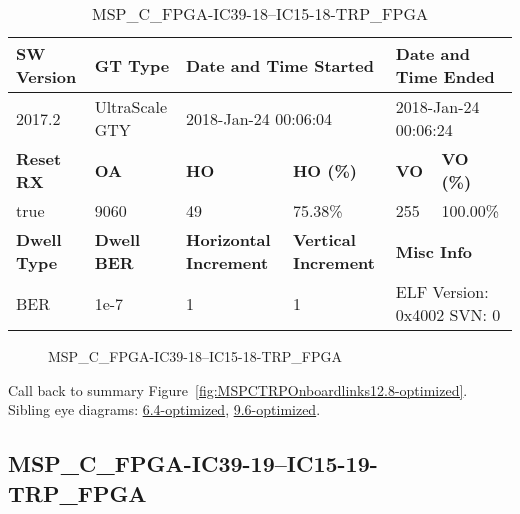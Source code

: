 \begin{table}[h]
\centering
\caption{MSP\_C\_FPGA-IC39-18--IC15-18-TRP\_FPGA}
\label{tab:MSPCFPGAIC3918IC1518TRPFPGA12.8-optimized}
\begin{tabular}{@{}|l|l|l|l|l|l|@{}}
\toprule
\textbf{SW Version}                & \textbf{GT Type}   & \multicolumn{2}{l|}{\textbf{Date and Time Started}}            & \multicolumn{2}{l|}{\textbf{Date and Time Ended}}        \\ \midrule
2017.2                       & UltraScale GTY          & \multicolumn{2}{l|}{2018-Jan-24 00:06:04}                   & \multicolumn{2}{l|}{2018-Jan-24 00:06:24}               \\ \midrule
\textbf{Reset RX}                  & \textbf{OA} & \textbf{HO}   & \textbf{HO (\%)} & \textbf{VO} & \textbf{VO (\%)} \\ \midrule
true & 9060        & 49          & 75.38\%        & 255        & 100.00\%       \\ \midrule
\textbf{Dwell Type}                & \textbf{Dwell BER} & \textbf{Horizontal Increment} & \textbf{Vertical Increment}    & \multicolumn{2}{l|}{\textbf{Misc Info}}                  \\ \midrule
BER                            & 1e-7        & 1        & 1           & \multicolumn{2}{l|}{ELF Version: 0x4002 SVN: 0}                         \\ \bottomrule
\end{tabular}
\end{table}

\begin{figure}[h]
\caption{MSP\_C\_FPGA-IC39-18--IC15-18-TRP\_FPGA} \label{fig:MSPCFPGAIC3918IC1518TRPFPGA12.8-optimized}
\end{figure}

Call back to summary Figure~\ref{fig:MSPCTRPOnboardlinks12.8-optimized}.
Sibling eye diagrams: \hyperref[sec:MSPCFPGAIC3918IC1518TRPFPGA6.4-optimized]{6.4-optimized}, \hyperref[sec:MSPCFPGAIC3918IC1518TRPFPGA9.6-optimized]{9.6-optimized}.

\clearpage
\newpage


\subsection{MSP\_C\_FPGA-IC39-19--IC15-19-TRP\_FPGA}\label{sec:MSPCFPGAIC3919IC1519TRPFPGA12.8-optimized}

